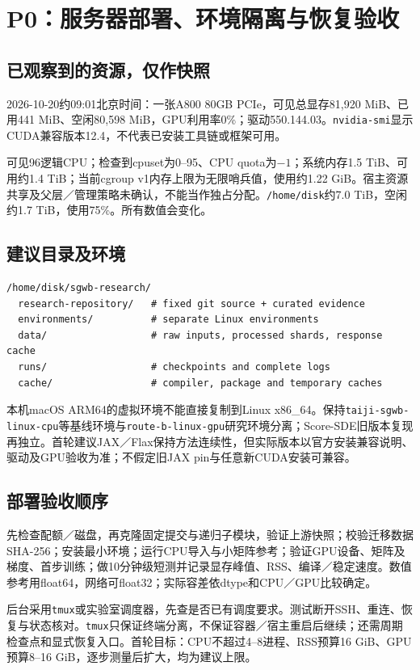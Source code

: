 \documentclass[UTF8,fontset=none,a4paper,11pt]{ctexart}
\newcommand{\code}[1]{\texttt{\nolinkurl{#1}}}
\begin{document}
\section{P0：服务器部署、环境隔离与恢复验收}
\subsection{已观察到的资源，仅作快照}
2026-10-20约09:01北京时间：一张A800 80GB PCIe，可见总显存81,920 MiB、已用441 MiB、空闲80,598 MiB，GPU利用率0\%；驱动550.144.03。\code{nvidia-smi}显示CUDA兼容版本12.4，不代表已安装工具链或框架可用。

可见96逻辑CPU；检查到cpuset为0--95、CPU quota为$-1$；系统内存1.5 TiB、可用约1.4 TiB；当前cgroup v1内存上限为无限哨兵值，使用约1.22 GiB。宿主资源共享及父层／管理策略未确认，不能当作独占分配。\code{/home/disk}约7.0 TiB，空闲约1.7 TiB，使用75\%。所有数值会变化。
\subsection{建议目录及环境}
\begin{lstlisting}
/home/disk/sgwb-research/
  research-repository/   # fixed git source + curated evidence
  environments/          # separate Linux environments
  data/                  # raw inputs, processed shards, response cache
  runs/                  # checkpoints and complete logs
  cache/                 # compiler, package and temporary caches
\end{lstlisting}
本机macOS ARM64的虚拟环境不能直接复制到Linux x86\_64。保持\code{taiji-sgwb-linux-cpu}等基线环境与\code{route-b-linux-gpu}研究环境分离；Score-SDE旧版本复现再独立。首轮建议JAX／Flax保持方法连续性，但实际版本以官方安装兼容说明、驱动及GPU验收为准；不假定旧JAX pin与任意新CUDA安装可兼容。
\subsection{部署验收顺序}
先检查配额／磁盘，再克隆固定提交与递归子模块，验证上游快照；校验迁移数据SHA-256；安装最小环境；运行CPU导入与小矩阵参考；验证GPU设备、矩阵及梯度、首步训练；做10分钟级短测并记录显存峰值、RSS、编译／稳定速度。数值参考用float64，网络可float32；实际容差依dtype和CPU／GPU比较确定。

后台采用\code{tmux}或实验室调度器，先查是否已有调度要求。测试断开SSH、重连、恢复与状态核对。\code{tmux}只保证终端分离，不保证容器／宿主重启后继续；还需周期检查点和显式恢复入口。首轮目标：CPU不超过4--8进程、RSS预算16 GiB、GPU预算8--16 GiB，逐步测量后扩大，均为建议上限。
\clearpage
\end{document}

